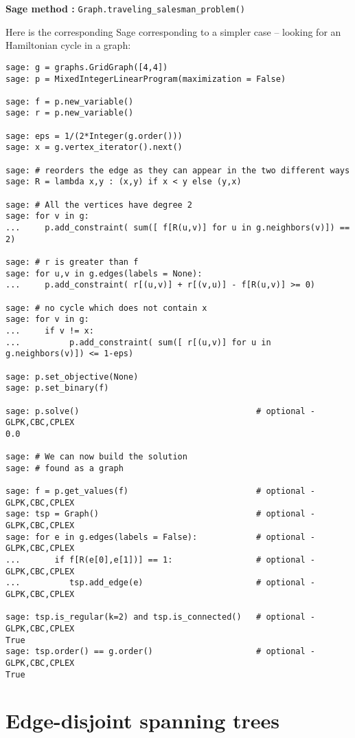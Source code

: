 {\bf Sage method : }\verb!Graph.traveling_salesman_problem()!

Here is the corresponding Sage corresponding to a simpler case -- looking for an Hamiltonian cycle in a graph:

\begin{lstlisting}
sage: g = graphs.GridGraph([4,4])
sage: p = MixedIntegerLinearProgram(maximization = False)

sage: f = p.new_variable()
sage: r = p.new_variable()

sage: eps = 1/(2*Integer(g.order()))
sage: x = g.vertex_iterator().next()

sage: # reorders the edge as they can appear in the two different ways
sage: R = lambda x,y : (x,y) if x < y else (y,x)

sage: # All the vertices have degree 2
sage: for v in g:
...     p.add_constraint( sum([ f[R(u,v)] for u in g.neighbors(v)]) == 2)

sage: # r is greater than f
sage: for u,v in g.edges(labels = None):
...     p.add_constraint( r[(u,v)] + r[(v,u)] - f[R(u,v)] >= 0)

sage: # no cycle which does not contain x
sage: for v in g:
...     if v != x:
...          p.add_constraint( sum([ r[(u,v)] for u in g.neighbors(v)]) <= 1-eps)

sage: p.set_objective(None)
sage: p.set_binary(f)

sage: p.solve()                                    # optional - GLPK,CBC,CPLEX
0.0

sage: # We can now build the solution
sage: # found as a graph

sage: f = p.get_values(f)                          # optional - GLPK,CBC,CPLEX
sage: tsp = Graph()                                # optional - GLPK,CBC,CPLEX
sage: for e in g.edges(labels = False):            # optional - GLPK,CBC,CPLEX
...       if f[R(e[0],e[1])] == 1:                 # optional - GLPK,CBC,CPLEX
...          tsp.add_edge(e)                       # optional - GLPK,CBC,CPLEX

sage: tsp.is_regular(k=2) and tsp.is_connected()   # optional - GLPK,CBC,CPLEX
True
sage: tsp.order() == g.order()                     # optional - GLPK,CBC,CPLEX
True
\end{lstlisting}



\section{Edge-disjoint spanning trees}

